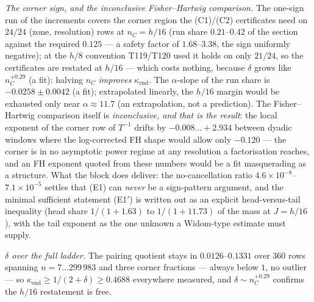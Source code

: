 \documentclass[11pt,a4paper]{article}
\begin{document}
\emph{The corner sign, and the inconclusive Fisher--Hartwig comparison.} The one-sign run of
the increments covers the corner region the (C1)/(C2) certificates need on $24/24$ (zone,
resolution) rows at $n_C=h/16$ (run share $0.21$--$0.42$ of the section against the required
$0.125$ --- a safety factor of $1.68$--$3.38$, the sign uniformly negative); at the $h/8$
convention T119/T120 used it holds on only $21/24$, so the certificates are restated at $h/16$
--- which costs nothing, because $\delta$ grows like $n_C^{+0.29}$ (a fit): halving $n_C$
\emph{improves} $\kappa_{\mathrm{end}}$. The $\alpha$-slope of the run share is
$-0.0258\pm0.0042$ (a fit); extrapolated linearly, the $h/16$ margin would be exhausted only
near $\alpha\approx11.7$ (an extrapolation, not a prediction). The Fisher--Hartwig comparison
itself is \emph{inconclusive, and that is the result}: the local exponent of the corner row of
$T^{-1}$ drifts by $-0.008\ldots+2.934$ between dyadic windows where the log-corrected FH shape
would allow only $-0.120$ --- the corner is in no asymptotic power regime at any resolution a
factorisation reaches, and an FH exponent quoted from these numbers would be a fit masquerading
as a structure. What the block does deliver: the no-cancellation ratio
$4.6\times10^{-8}$--$7.1\times10^{-5}$ settles that (E1) can \emph{never} be a sign-pattern
argument, and the minimal sufficient statement (E1$'$) is written out as an explicit
head-versus-tail inequality (head share $1/(1+1.63)$ to $1/(1+11.73)$ of the mass at $J=h/16$),
with the tail exponent as the one unknown a Widom-type estimate must supply.

\emph{$\delta$ over the full ladder.} The pairing quotient stays in $0.0126$--$0.1331$ over
$360$ rows spanning $n=7\ldots299\,983$ and three corner fractions --- always below $1$, no
outlier --- so $\kappa_{\mathrm{end}}\ge1/(2+\delta)\ge0.4688$ everywhere measured, and
$\delta\sim n_C^{+0.29}$ confirms the $h/16$ restatement is free.
\end{document}
